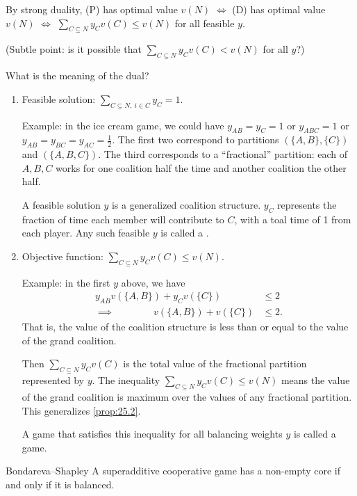 \documentclass[12pt,letterpaper]{report}
\begin{document}
By strong duality, (P) has optimal value $v(N)$ $\iff$ (D) has optimal value $v(N)$ $\iff$
$\sum\limits_{C \subseteq N} y_C v(C) \leq v(N)$ for all feasible $y$.

(Subtle point: is it possible that $\sum\limits_{C \subseteq N} y_C v(C) < v(N)$ for all $y$?)

What is the meaning of the dual?

\begin{enumerate}
  \item
  Feasible solution: $\sum\limits_{C \subseteq N, \ i \in C} y_C = 1$.

  Example: in the ice cream game, we could have $y_{AB} = y_C = 1$ or $y_{ABC} = 1$ or
  $y_{AB} = y_{BC} = y_{AC} = \frac{1}{2}$.
  The first two correspond to partitions $(\{A, B\}, \{C\})$ and $(\{A, B, C\})$.
  The third corresponds to a ``fractional'' partition: each of $A, B, C$ works for one coalition
  half the time and another coalition the other half.

  A feasible solution $y$ is a generalized coalition structure.
  $y_C$ represents the fraction of time each member will contribute to $C$, with a toal time of 1
  from each player.
  Any such feasible $y$ is called a .

  \item
  Objective function: $\sum\limits_{C \subseteq N} y_C v(C) \leq v(N)$.

  Example: in the first $y$ above, we have
  \begin{align*}
    y_{AB} v(\{A, B\}) + y_C v(\{C\}) &\leq 2 \\
    \implies\qquad\qquad v(\{A, B\}) + v(\{C\}) &\leq 2.
  \end{align*}
  That is, the value of the coalition structure is less than or equal to the value of the grand
  coalition.

  Then $\sum\limits_{C \subseteq N} y_C v(C)$ is the total value of the fractional partition
  represented by $y$.
  The inequality $\sum\limits_{C \subseteq N} y_C v(C) \leq v(N)$ means the value of the grand
  coalition is maximum over the values of any fractional partition.
  This generalizes \cref{prop:25.2}.

  A game that satisfies this inequality for all balancing weights $y$ is called a 
  game.
\end{enumerate}

\begin{thm*}{Bondareva--Shapley}
  A superadditive cooperative game has a non-empty core if and only if it is balanced.
\end{thm*}
\end{document}
